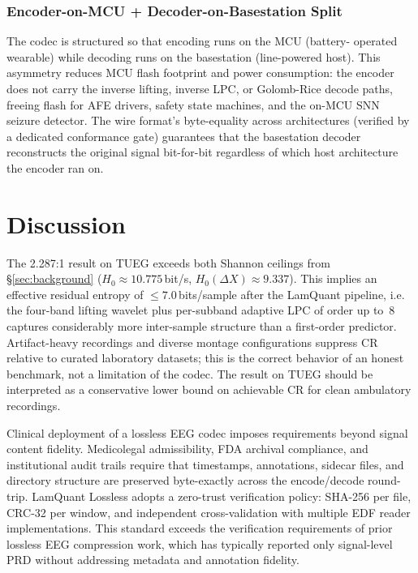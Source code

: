 \documentclass[journal]{IEEEtran}
\begin{document}
\subsubsection{Encoder-on-MCU + Decoder-on-Basestation Split}
The codec is structured so that encoding runs on the MCU (battery-
operated wearable) while decoding runs on the basestation
(line-powered host). This asymmetry reduces MCU flash footprint and
power consumption: the encoder does not carry the inverse lifting,
inverse LPC, or Golomb-Rice decode paths, freeing flash for AFE
drivers, safety state machines, and the on-MCU SNN seizure
detector. The wire format's byte-equality across architectures
(verified by a dedicated conformance gate) guarantees that the
basestation decoder reconstructs the original signal bit-for-bit
regardless of which host architecture the encoder ran on.


\section{Discussion}
\label{sec:discussion}

The 2.287:1 result on TUEG exceeds both Shannon ceilings from
\S\ref{sec:background} ($H_0 \approx 10.775$\,bit/s,
$H_0(\Delta X) \approx 9.337$). This implies an effective residual
entropy of $\leq 7.0$\,bits/sample after the LamQuant pipeline,
i.e. the four-band lifting wavelet plus per-subband adaptive LPC
of order up to~8 captures considerably more inter-sample structure
than a first-order predictor. Artifact-heavy recordings and diverse
montage configurations suppress CR relative to curated laboratory
datasets; this is the correct behavior of an honest benchmark, not
a limitation of the codec. The result on TUEG should be interpreted
as a conservative lower bound on achievable CR for clean ambulatory
recordings.

Clinical deployment of a lossless EEG codec imposes requirements
beyond signal content fidelity. Medicolegal admissibility, FDA
archival compliance, and institutional audit trails require that
timestamps, annotations, sidecar files, and directory structure are
preserved byte-exactly across the encode/decode round-trip. LamQuant
Lossless adopts a zero-trust verification policy: SHA-256 per file,
CRC-32 per window, and independent cross-validation with multiple EDF
reader implementations. This standard exceeds the verification
requirements of prior lossless EEG compression work, which has
typically reported only signal-level PRD without addressing metadata
and annotation fidelity.
\end{document}

